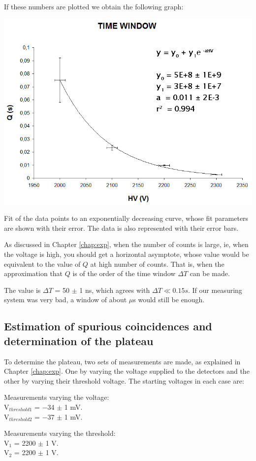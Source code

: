 If these numbers are plotted we obtain the following graph:

			\bfi[H]
				\bc\includegraphics[width=\textwidth]{img/timeWindow.png}\ec
				\caption[Time window fit.]{Fit of the data points to an exponentially decreasing curve, whose fit parameters are shown with their error. The data is also represented with their error bars.}\label{fig:timeWin}
			\efi\vspace*{-1ex}

As discussed in Chapter \ref{chap:exp}, when the number of counts is large, ie, when the voltage is high, you should get a horizontal asymptote, whose value would be equivalent to the value of $Q$ at high number of counts. That is, when the approximation that $Q$ is of the order of the time window $\Delta T$ can be made.

The value is $\Delta T$ = 50 $\pm$ 1 ns, which agrees with $\Delta T \ll 0.15 s$. If our measuring system was very bad, a window of about $\mu$s would still be enough.
	
\subsection{Estimation of spurious coincidences and determination of the plateau}

To determine the plateau, two sets of measurements are made, as explained in Chapter \ref{chap:exp}. One by varying the voltage supplied to the detectors and the other by varying their threshold voltage. The starting voltages in each case are:

		\noindent\begin{minipage}{0.5\textwidth} 
			\bc
				Measurements varying the voltage:\\
				V$_{threshold1}$ = $-$34 $\pm$ 1 mV.\\
				V$_{threshold2}$ = $-$37 $\pm$ 1 mV.
			\ec
		\end{minipage}
		\begin{minipage}{0.5\textwidth} 
			\bc
				Measurements varying the threshold:\\
				V$_1$ = 2200 $\pm$ 1 V.\\
				V$_2$ = 2200 $\pm$ 1 V.
			\ec
		\end{minipage}

